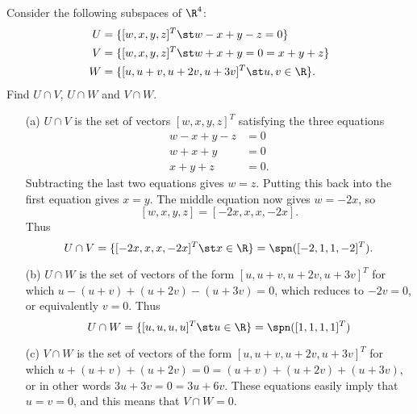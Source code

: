 \begin{exercise}\label{ex-subspaces-R-three}
 Consider the following subspaces of $\R^4$:
 \begin{align*}
  U &= \{ [w,x,y,z]^T \st w-x+y-z=0 \} \\
  V &= \{ [w,x,y,z]^T \st w+x+y=0=x+y+z \} \\
  W &= \{ [u,u+v,u+2v,u+3v]^T \st u,v\in\R\}.
 \end{align*}
 Find $U\cap V$, $U\cap W$ and $V\cap W$.
\end{exercise}
\begin{solution}
 \begin{itemize}
  \item[(a)] $U\cap V$ is the set of vectors $[w,x,y,z]^T$
   satisfying the three equations
   \begin{align*}
    w-x+y-z &= 0 \\
    w+x+y &= 0 \\
    x+y+z &= 0.
   \end{align*}
   Subtracting the last two equations gives $w=z$.  Putting
   this back into the first equation gives $x=y$.  The
   middle equation now gives $w=-2x$, so 
   \[ [w,x,y,z] = [-2x,x,x,-2x]. \]
   Thus 
   \[ U\cap V = \{ [-2x,x,x,-2x]^T \st x\in\R\} = 
       \spn([-2,1,1,-2]^T).
   \]
  \item[(b)] $U\cap W$ is the set of vectors of the form
   $[u,u+v,u+2v,u+3v]^T$ for which
   $u-(u+v)+(u+2v)-(u+3v)=0$, which reduces to $-2v=0$, or
   equivalently $v=0$.  Thus 
   \[ U\cap W = \{[u,u,u,u]^T\st u\in\R\} = 
       \spn([1,1,1,1]^T) 
   \]
  \item[(c)] $V\cap W$ is the set of vectors of the form 
   $[u,u+v,u+2v,u+3v]^T$ for which
   $u+(u+v)+(u+2v)=0=(u+v)+(u+2v)+(u+3v)$, or in other words
   $3u+3v=0=3u+6v$.  These equations easily imply that
   $u=v=0$, and this means that $V\cap W=0$.
 \end{itemize}
\end{solution}

